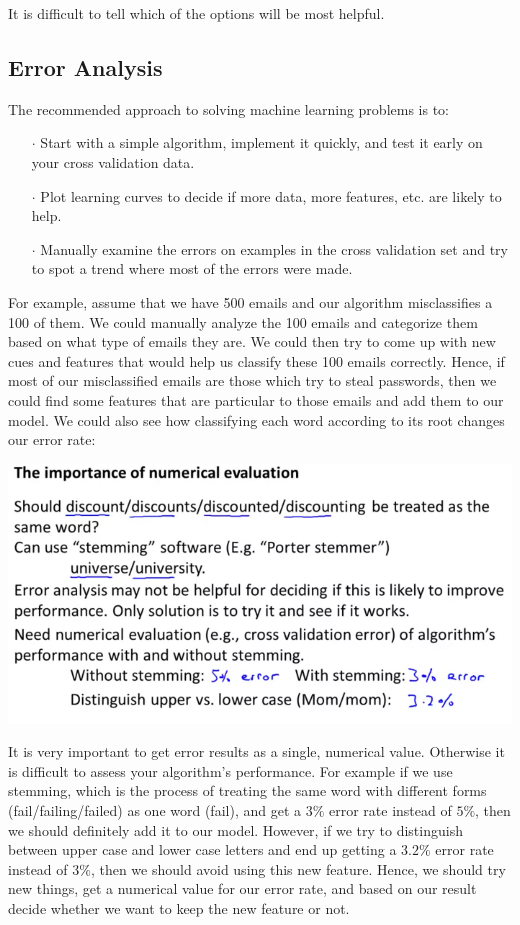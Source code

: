 \documentclass[UTF8]{article}
\begin{document}
It is difficult to tell which of the options will be most helpful.

\subsection{Error Analysis}

The recommended approach to solving machine learning problems is to:

\begin{itemize}
\item[$\cdot$]Start with a simple algorithm, implement it quickly, and test it early on your cross validation data.
\item[$\cdot$]Plot learning curves to decide if more data, more features, etc. are likely to help.
\item[$\cdot$]Manually examine the errors on examples in the cross validation set and try to spot a trend where most of the errors were made.
\end{itemize}

For example, assume that we have 500 emails and our algorithm misclassifies a 100 of them. We could manually analyze the 100 emails and categorize them based on what type of emails they are. We could then try to come up with new cues and features that would help us classify these 100 emails correctly. Hence, if most of our misclassified emails are those which try to steal passwords, then we could find some features that are particular to those emails and add them to our model. We could also see how classifying each word according to its root changes our error rate:

\includegraphics[width = \textwidth]{NotePics/11_2_1.png}

It is very important to get error results as a single, numerical value. Otherwise it is difficult to assess your algorithm's performance. For example if we use stemming, which is the process of treating the same word with different forms (fail/failing/failed) as one word (fail), and get a $3\%$ error rate instead of $5\%$, then we should definitely add it to our model. However, if we try to distinguish between upper case and lower case letters and end up getting a $3.2\%$ error rate instead of $3\%$, then we should avoid using this new feature. Hence, we should try new things, get a numerical value for our error rate, and based on our result decide whether we want to keep the new feature or not.

\newpage
\end{document}
